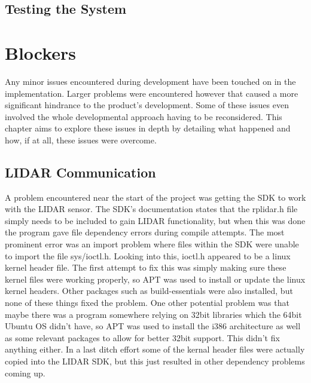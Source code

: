		\section{Testing the System}
				
	\chapter{Blockers}
	Any minor issues encountered during development have been touched on in the implementation. Larger problems were encountered however that caused a more significant hindrance to the product's development. Some of these issues even involved the whole developmental approach having to be reconsidered. This chapter aims to explore these issues in depth by detailing what happened and how, if at all, these issues were overcome.
		
		\section{LIDAR Communication}
		A problem encountered near the start of the project was getting the SDK to work with the LIDAR sensor. The SDK's documentation states that the rplidar.h file simply needs to be included to gain LIDAR functionality, but when this was done the program gave file dependency errors during compile attempts. The most prominent error was an import problem where files within the SDK were unable to import the file sys/ioctl.h. Looking into this, ioctl.h appeared to be a linux kernel header file. The first attempt to fix this was simply making sure these kernel files were working properly, so APT was used to install or update the linux kernel headers. Other packages such as build-essentials were also installed, but none of these things fixed the problem. One other potential problem was that maybe there was a program somewhere relying on 32bit libraries which the 64bit Ubuntu OS didn't have, so APT was used to install the i386 architecture as well as some relevant packages to allow for better 32bit support. This didn't fix anything either. In a last ditch effort some of the kernal header files were actually copied into the LIDAR SDK, but this just resulted in other dependency problems coming up.
		
